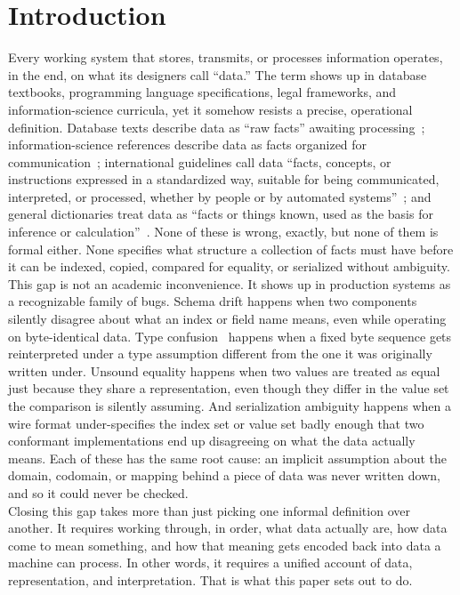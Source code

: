 \section{Introduction}
\label{sec:introduction}

Every working system that stores, transmits, or processes information operates,
in the end, on what its designers call ``data.'' The term shows up in database
textbooks, programming language specifications, legal frameworks, and
information-science curricula, yet it somehow resists a precise, operational
definition. Database texts describe data as ``raw facts'' awaiting
processing~\autocite{rob2013}; information-science references describe data as
facts organized for communication~\autocite{ratzan2004}; international
guidelines call data ``facts, concepts, or instructions expressed in a
standardized way, suitable for being communicated, interpreted, or processed,
whether by people or by automated systems''~\autocite{unesco2008}; and general
dictionaries treat data as ``facts or things known, used as the basis for
inference or calculation''~\autocite{oed2023}. None of these is wrong, exactly,
but none of them is formal either. None specifies what structure a collection
of facts must have before it can be indexed, copied, compared for equality, or
serialized without ambiguity.\\
This gap is not an academic inconvenience. It shows up in production systems
as a recognizable family of bugs. Schema drift happens when two components
silently disagree about what an index or field name means, even while
operating on byte-identical data. Type confusion~\autocite{cwe843} happens when
a fixed byte sequence gets reinterpreted under a type assumption different from
the one it was originally written under. Unsound equality happens when two
values are treated as equal just because they share a representation, even
though they differ in the value set the comparison is silently assuming. And
serialization ambiguity happens when a wire format under-specifies the index
set or value set badly enough that two conformant implementations end up
disagreeing on what the data actually means. Each of these has the same root
cause: an implicit assumption about the domain, codomain, or mapping behind a
piece of data was never written down, and so it could never be checked.\\
Closing this gap takes more than just picking one informal definition over
another. It requires working through, in order, what data actually are, how
data come to mean something, and how that meaning gets encoded back into data
a machine can process. In other words, it requires a unified account of data,
representation, and interpretation. That is what this paper sets out to do.

